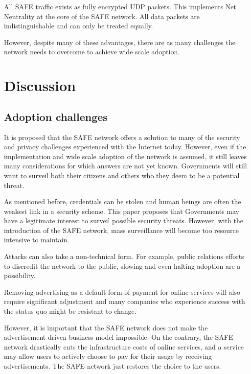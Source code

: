 \documentclass[twocolumn,english]{article}
\begin{document}
All SAFE traffic exists as fully encrypted UDP packets. This implements Net Neutrality at the core of the SAFE network.  All data packets are indistinguishable and can only be treated equally.

However, despite many of these advantages, there
are as many challenges the network needs to overcome to achieve
wide scale adoption.


\section{Discussion}

\subsection{Adoption challenges}

It is proposed that the SAFE network offers a solution to many of
the security and privacy challenges experienced with the Internet
today. However, even if the implementation and wide scale adoption
of the network is assumed, it still leaves many considerations for
which answers are not yet known. Governments will still want to surveil
both their citizens and others who they deem to be a potential threat.

As mentioned before, credentials can be stolen and human beings are often the weakest link in a security scheme.  This paper proposes that Governments may have a legitimate interest to surveil possible security threats.  However, with the introduction of the SAFE network, mass surveillance will become too resource intensive to maintain.

Attacks can also take a non-technical
form. For example, public relations efforts to discredit the network
to the public, slowing and even halting adoption are a possibility.

Removing advertising as a default form of payment for online services will
also require significant adjustment and many companies who experience success with the status quo might be resistant to
change.

However, it is important that the SAFE network does not make the advertisement driven business model impossible.  On the contrary, the SAFE network drastically cuts the infrastructure costs of online services, and a service may allow users to actively choose to pay for their usage by receiving advertisements.  The SAFE network just restores the choice to the users.

\end{document}
